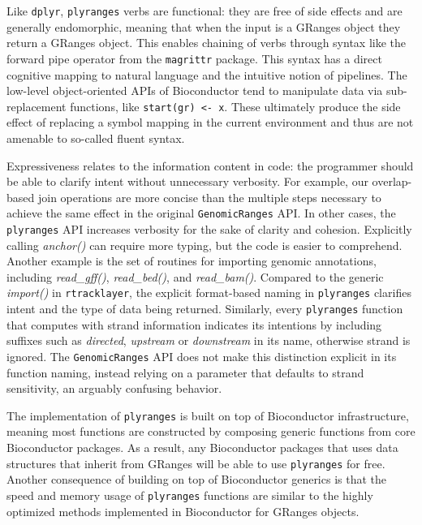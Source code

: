 \documentclass[]{article}
\begin{document}
Like \texttt{dplyr}, \texttt{plyranges} verbs are functional: they are
free of side effects and are generally endomorphic, meaning that when
the input is a GRanges object they return a GRanges object. This enables
chaining of verbs through syntax like the forward pipe operator from the
\texttt{magrittr} package. This syntax has a direct cognitive mapping to
natural language and the intuitive notion of pipelines. The low-level
object-oriented APIs of Bioconductor tend to manipulate data via
sub-replacement functions, like \texttt{start(gr)\ \textless{}-\ x}.
These ultimately produce the side effect of replacing a symbol mapping
in the current environment and thus are not amenable to so-called fluent
syntax.

Expressiveness relates to the information content in code: the
programmer should be able to clarify intent without unnecessary
verbosity. For example, our overlap-based join operations are more
concise than the multiple steps necessary to achieve the same effect in
the original \texttt{GenomicRanges} API. In other cases, the
\texttt{plyranges} API increases verbosity for the sake of clarity and
cohesion. Explicitly calling \emph{anchor()} can require more typing,
but the code is easier to comprehend. Another example is the set of
routines for importing genomic annotations, including
\emph{read\_gff()}, \emph{read\_bed()}, and \emph{read\_bam()}. Compared
to the generic \emph{import()} in \texttt{rtracklayer}, the explicit
format-based naming in \texttt{plyranges} clarifies intent and the type
of data being returned. Similarly, every \texttt{plyranges} function
that computes with strand information indicates its intentions by
including suffixes such as \emph{directed}, \emph{upstream} or
\emph{downstream} in its name, otherwise strand is ignored. The
\texttt{GenomicRanges} API does not make this distinction explicit in
its function naming, instead relying on a parameter that defaults to
strand sensitivity, an arguably confusing behavior.

The implementation of \texttt{plyranges} is built on top of Bioconductor
infrastructure, meaning most functions are constructed by composing
generic functions from core Bioconductor packages. As a result, any
Bioconductor packages that uses data structures that inherit from
GRanges will be able to use \texttt{plyranges} for free. Another
consequence of building on top of Bioconductor generics is that the
speed and memory usage of \texttt{plyranges} functions are similar to
the highly optimized methods implemented in Bioconductor for GRanges
objects.
\end{document}
